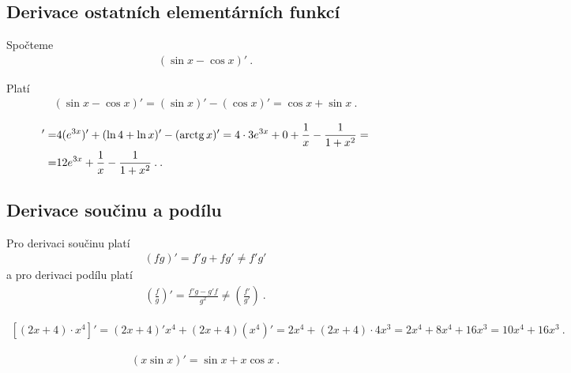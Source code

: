\subsection*{Derivace ostatních elementárních funkcí}

\begin{example}
    Spočteme
    \begin{align}
        (\sin x - \cos x)' \:.
    \end{align}

    Platí
    \begin{align}
        (\sin x - \cos x)' = (\sin x)' - (\cos x)' = \cos x + \sin x \:.
    \end{align}
\end{example}

\begin{example}
    \begin{align}
        [4e^{3x} + \ln (4x) - \arctg x]' =& 4 (e^{3x})' + (\ln 4 + \ln x)' - (\arctg x)' = 4 \cdot 3 e^{3x} + 0 + \frac{1}{x} - \frac{1}{1+x^2} = \\
        =& 12 e^{3x} + \frac{1}{x} - \frac{1}{1+x^2} \:.
        \:.
    \end{align}
\end{example}

\subsection*{Derivace součinu a podílu}

Pro derivaci součinu platí
\begin{align}
    (fg)'=f'g + f g' \neq f'g'
\end{align}
a pro derivaci podílu platí
\begin{align}
    \left( \frac{f}{g} \right)' = \frac{f'g - g' f}{g^2} \neq \left( \frac{f'}{g'} \right) \:.
\end{align}

\begin{example}
    \begin{align}
        \left[ (2x+4)\cdot x^4 \right]' = (2x+4)' x^4 + (2x+4) (x^4)' = 2 x^4 + 
        (2x+4) \cdot 4x^3 = 2 x^4 + 8x^4 + 16 x^3 = 10 x^4 + 16 x^3 \:.
    \end{align}
\end{example}

\begin{example}
    \begin{align}
        (x \sin x)' = \sin x + x \cos x \:.
    \end{align}
\end{example}

